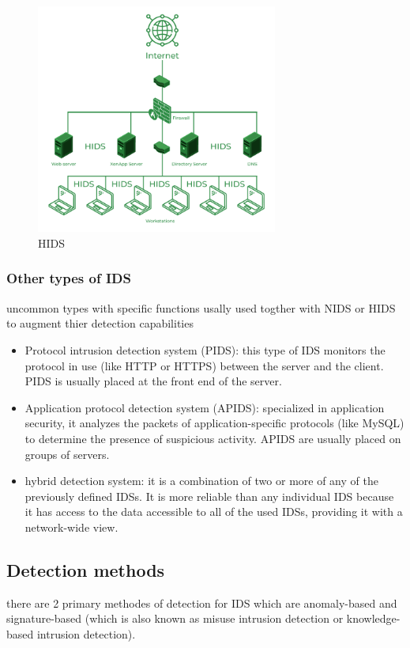 \begin{figure}[h]
	\centering
	\includegraphics[width=300px]{figures/HIDS.png}
	\caption{HIDS \cite{geeksforgeeks}}
	\label{fig:HIDS}
\end{figure}



\subsubsection{Other types of IDS}
uncommon types with specific functions usally used togther with NIDS or HIDS to augment thier detection capabilities

\firmlist
\begin{itemize}
	\item Protocol intrusion detection system (PIDS): this type of IDS monitors the protocol in use (like HTTP or HTTPS) between the server and the client. PIDS is usually placed at the front end of the server. \cite{geeksforgeeks}


	\item Application protocol detection system (APIDS): specialized in application security, it analyzes the packets of application-specific protocols (like MySQL) to determine the presence of suspicious activity. APIDS are usually placed on groups of servers. \cite{geeksforgeeks}
	

	\item hybrid detection system: it is a combination of two or more of any of the previously defined IDSs. It is more reliable than any individual IDS because it has access to the data accessible to all of the used IDSs, providing it with a network-wide view.
	\cite{geeksforgeeks}
\end{itemize}




\subsection{Detection methods}
there are 2 primary methodes of detection for IDS which are anomaly-based and signature-based (which is also known as misuse intrusion detection or knowledge-based intrusion detection). \cite{ids-classification}



